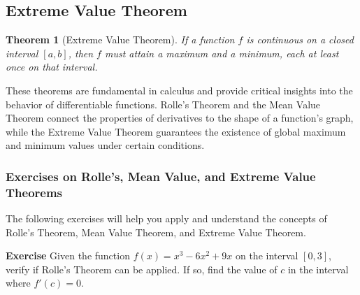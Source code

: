\documentclass[a4paper,12pt]{book}
\newenvironment{exercise}[1][]
  {\par\medskip\noindent\textbf{Exercise #1} \rmfamily}
  {\medskip}
\newcounter{example}
\newtheorem{theorem}{Theorem}
\begin{document}
\subsection{Extreme Value Theorem}
\begin{theorem}[Extreme Value Theorem]
If a function \( f \) is continuous on a closed interval \([a, b]\), then \( f \) must attain a maximum and a minimum, each at least once on that interval.
\end{theorem}

\begin{center}
\end{center}

These theorems are fundamental in calculus and provide critical insights into the behavior of differentiable functions. Rolle's Theorem and the Mean Value Theorem connect the properties of derivatives to the shape of a function's graph, while the Extreme Value Theorem guarantees the existence of global maximum and minimum values under certain conditions.

\subsubsection*{Exercises on Rolle's, Mean Value, and Extreme Value Theorems}

The following exercises will help you apply and understand the concepts of Rolle's Theorem, Mean Value Theorem, and Extreme Value Theorem.

\begin{exercise}
Given the function \( f(x) = x^3 - 6x^2 + 9x \) on the interval \([0, 3]\), verify if Rolle's Theorem can be applied. If so, find the value of \( c \) in the interval where \( f'(c) = 0 \).
\end{exercise}
\end{document}
